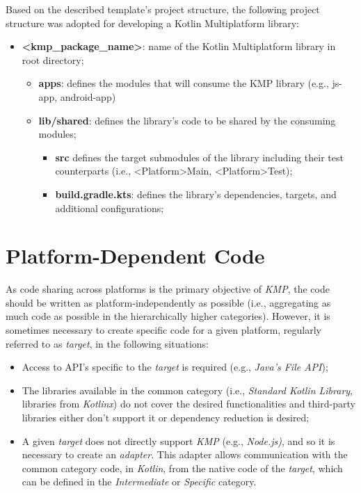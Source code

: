 Based on the described template's project structure, the following project structure was adopted for developing a Kotlin Multiplatform library:

\begin{itemize}
    \item \textbf{\textless kmp\_package\_name\textgreater}: name of the Kotlin Multiplatform library in root directory;
    \begin{itemize}
        \item \textbf{apps}: defines the modules that will consume the KMP library (e.g., js-app, android-app)
        \item \textbf{lib/shared}: defines the library's code to be shared by the consuming modules;
        \begin{itemize}
            \item \textbf{src} defines the target submodules of the library including their test counterparts (i.e., \textless Platform\textgreater Main, \textless Platform\textgreater Test);
            \item \textbf{build.gradle.kts}: defines the library's dependencies, targets, and additional configurations;
        \end{itemize}
    \end{itemize}
\end{itemize}


\section{Platform-Dependent Code}\label{sec:platform-dependent-code}

As code sharing across platforms is the primary objective of \textit{KMP}, the code should be written as platform-independently as possible (i.e., aggregating as much code as possible in the hierarchically higher categories).
However, it is sometimes necessary to create specific code for a given platform, regularly referred to as \textit{target}, in the following situations:

\begin{itemize}
    \item Access to API's specific to the \textit{target} is required (e.g., \textit{Java's File API});
    \item The libraries available in the common category (i.e., \textit{Standard Kotlin Library}, libraries from \textit{Kotlinx}) do not cover the desired functionalities and third-party libraries either don't support it or dependency reduction is desired;
    \item A given \textit{target} does not directly support \textit{KMP} (e.g., \textit{Node.js)}, and so it is necessary to create an \textit{adapter}.
    This adapter allows communication with the common category code, in \textit{Kotlin}, from the native code of the \textit{target}, which can be defined in the \textit{Intermediate} or \textit{Specific} category.
\end{itemize}

